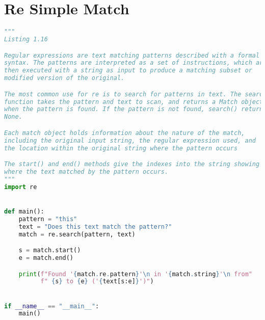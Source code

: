 \documentclass[a4paper,landscape]{report}
\begin{document}
\section{Re Simple Match}
\begin{lstlisting}[language=Python]
"""
Listing 1.16

Regular expressions are text matching patterns described with a formal
syntax. The patterns are interpreted as a set of instructions, which are
then executed with a string as input to produce a matching subset or
modified version of the original.

The most common use for re is to search for patterns in text. The search()
function takes the pattern and text to scan, and returns a Match object
when the pattern is found. If the pattern is not found, search() returns
None.

Each match object holds information about the nature of the match,
including the original input string, the regular expression used, and
the location within the original string where the pattern occurs

The start() and end() methods give the indexes into the string showing
where the text matched by the pattern occurs.
"""
import re


def main():
    pattern = "this"
    text = "Does this text match the pattern?"
    match = re.search(pattern, text)

    s = match.start()
    e = match.end()

    print(f"Found '{match.re.pattern}'\n in '{match.string}'\n from"
          f" {s} to {e} ('{text[s:e]}')")


if __name__ == "__main__":
    main()

\end{lstlisting}
\end{document}
